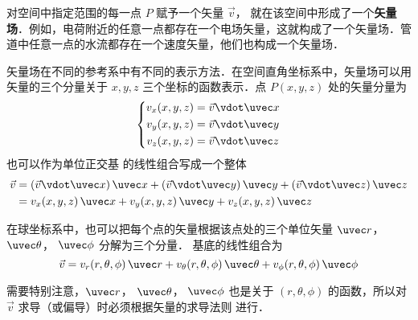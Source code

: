 

对空间中指定范围的每一点 $P$ 赋予一个矢量 $\vec v$， 就在该空间中形成了一个\textbf{矢量场}．例如，电荷附近的任意一点都存在一个电场矢量，这就构成了一个矢量场．管道中任意一点的水流都存在一个速度矢量，他们也构成一个矢量场．

矢量场在不同的参考系中有不同的表示方法．在空间直角坐标系中，矢量场可以用矢量的三个分量关于 $x,y,z$ 三个坐标的函数表示．点 $P(x,y,z)$ 处的矢量分量为
 \begin{equation}
\left\{ \begin{aligned}
{v_x}(x,y,z) &= \vec v \vdot \uvec x\\
{v_y}(x,y,z) &= \vec v \vdot \uvec y\\
{v_z}(x,y,z) &= \vec v \vdot \uvec z
\end{aligned} \right. 
\end{equation}
也可以作为单位正交基 的线性组合写成一个整体
\begin{equation}
\begin{split}
\vec v &= (\vec v \vdot \uvec x)\,\uvec x + (\vec v \vdot \uvec y)\,\uvec y + (\vec v \vdot \uvec z)\,\uvec z\\
 &= {v_x}(x,y,z)\,\uvec x + {v_y}(x,y,z)\,\uvec y + {v_z}(x,y,z)\,\uvec z
\end{split} \end{equation}
 

在球坐标系中，也可以把每个点的矢量根据该点处的三个单位矢量 $\uvec r$，  $\uvec \theta$，  $\uvec \phi$ 分解为三个分量． 基底的线性组合为
\begin{equation}
\vec v = {v_r}(r,\theta ,\phi)\,\uvec r + {v_\theta }(r,\theta ,\phi) \,\uvec\theta  + {v_\phi }(r,\theta ,\phi)\,\uvec \phi  
\end{equation} 

需要特别注意，$\uvec r$，  $\uvec \theta$，  $\uvec \phi$ 也是关于 $(r,\theta ,\phi )$ 的函数，所以对 $\vec v$ 求导（或偏导）时必须根据矢量的求导法则 进行．




